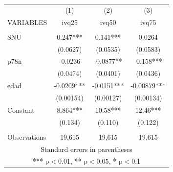 \begin{tabular}{lccc} \hline
 & (1) & (2) & (3) \\
VARIABLES & ivq25 & ivq50 & ivq75 \\ \hline
 &  &  &  \\
SNU & 0.247*** & 0.141*** & 0.0264 \\
 & (0.0627) & (0.0535) & (0.0583) \\
p78n & -0.0236 & -0.0877** & -0.158*** \\
 & (0.0474) & (0.0401) & (0.0436) \\
edad & -0.0209*** & -0.0151*** & -0.00879*** \\
 & (0.00154) & (0.00127) & (0.00134) \\
Constant & 8.864*** & 10.58*** & 12.46*** \\
 & (0.134) & (0.110) & (0.122) \\
 &  &  &  \\
 Observations & 19,615 & 19,615 & 19,615 \\ \hline
\multicolumn{4}{c}{ Standard errors in parentheses} \\
\multicolumn{4}{c}{ *** p$<$0.01, ** p$<$0.05, * p$<$0.1} \\
\end{tabular}
